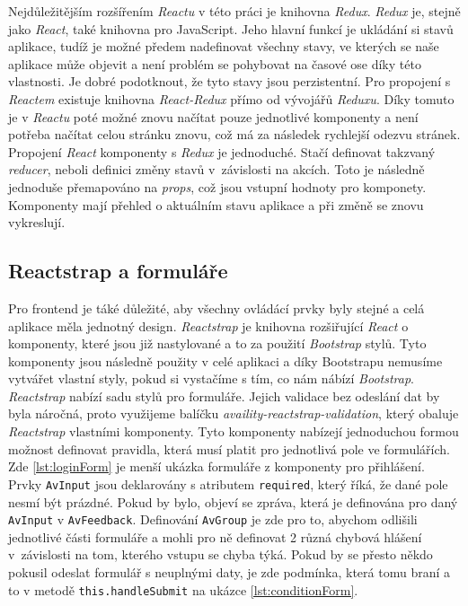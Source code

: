 Nejdůležitějším rozšířením \textit{Reactu} v této práci je knihovna \textit{Redux}. \textit{Redux} je, stejně jako \textit{React}, také knihovna pro JavaScript. Jeho hlavní funkcí je
ukládání si stavů aplikace, tudíž je možné předem nadefinovat všechny stavy, ve kterých se naše aplikace může objevit a není problém se pohybovat na časové ose
díky této vlastnosti. Je dobré podotknout, že tyto stavy jsou perzistentní. Pro propojení s \textit{Reactem} existuje knihovna \textit{React-Redux} přímo od vývojářů \textit{Reduxu}. \cite{redux}
Díky tomuto je v \textit{Reactu} poté možné znovu načítat pouze jednotlivé komponenty a není potřeba načítat celou stránku znovu, což má za následek rychlejší odezvu stránek.
Propojení \textit{React} komponenty s \textit{Redux} je jednoduché. Stačí definovat takzvaný \textit{reducer}, neboli definici změny stavů v~závislosti na akcích. Toto je
následně jednoduše přemapováno na \textit{props}, což jsou vstupní hodnoty pro komponety. Komponenty mají přehled o aktuálním stavu aplikace a při změně se znovu vykreslují.

\subsection{Reactstrap a formuláře}

Pro frontend je táké důležité, aby všechny ovládácí prvky byly stejné a celá aplikace měla jednotný design. \textit{Reactstrap} je knihovna rozšiřující \textit{React}
o komponenty,
které jsou již nastylované a to za použití \textit{Bootstrap} stylů. Tyto komponenty jsou následně použity v celé aplikaci a díky Bootstrapu nemusíme vytvářet vlastní styly,
pokud si vystačíme s tím, co nám nábízí \textit{Bootstrap}. \textit{Reactstrap} nabízí sadu stylů pro formuláře. Jejich validace bez odeslání dat by byla náročná, proto
využijeme balíčku \textit{availity-reactstrap-validation}, který obaluje \textit{Reactstrap} vlastními komponenty. Tyto komponenty nabízejí jednoduchou formou možnost
definovat pravidla, která musí platit pro jednotlivá pole ve formulářích. Zde \ref{lst:loginForm} je menší ukázka formuláře z komponenty pro přihlášení. Prvky \texttt{AvInput}
jsou deklarovány s atributem \texttt{required}, který říká, že dané pole nesmí být prázdné. Pokud by bylo, objeví se zpráva, která je definována pro daný \texttt{AvInput} v
\texttt{AvFeedback}. Definování \texttt{AvGroup} je zde pro to, abychom odlišili jednotlivé části formuláře a mohli pro ně definovat 2 různá chybová hlášení v~závislosti na
tom, kterého vstupu se chyba týká. Pokud by se přesto někdo pokusil odeslat formulář s neuplnými daty, je zde podmínka, která tomu braní a to v metodě \texttt{this.handleSubmit}
na ukázce \ref{lst:conditionForm}.


